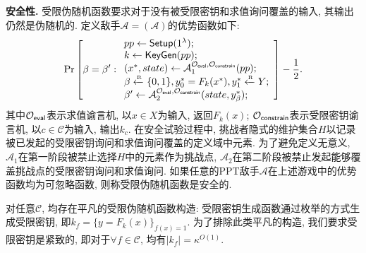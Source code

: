 \begin{trivlist}
\item \textbf{安全性.} 受限伪随机函数要求对于没有被受限密钥和求值询问覆盖的输入, 其输出仍然是伪随机的. 
    定义敌手$\mathcal{A} = (\mathcal{A})$的优势函数如下: 
\begin{displaymath}
    \Pr \left[\beta = \beta': 
    \begin{array}{l}
        pp \leftarrow \mathsf{Setup}(1^\lambda); \\
        k \leftarrow \mathsf{KeyGen}(pp); \\
        (x^*, state) \leftarrow \mathcal{A}_1^{\mathcal{O}_\mathsf{eval}, \mathcal{O}_\mathsf{constrain}}(pp);\\
        \beta \xleftarrow{\textup{\tiny R}} \{0, 1\}, y_0^* = F_k(x^*), y_1^* \xleftarrow{\textup{\tiny R}} Y; \\
        \beta' \leftarrow \mathcal{A}_2^{\mathcal{O}_\mathsf{eval}, \mathcal{O}_\mathsf{constrain}}(state, y_\beta^*);
    \end{array}
    \right] - \frac{1}{2}.
\end{displaymath}
其中$\mathcal{O}_\mathsf{eval}$表示求值谕言机, 以$x \in X$为输入, 返回$F_k(x)$; 
$\mathcal{O}_\mathsf{constrain}$表示受限密钥谕言机, 以$c \in \mathcal{C}$为输入, 输出$k_c$. 
在安全试验过程中, 挑战者隐式的维护集合$H$以记录被已发起的受限密钥询问和求值询问覆盖的定义域中元素.  
为了避免定义无意义, $\mathcal{A}_1$在第一阶段被禁止选择$H$中的元素作为挑战点, 
$\mathcal{A}_2$在第二阶段被禁止发起能够覆盖挑战点的受限密钥询问和求值询问. 
如果任意的PPT敌手$\mathcal{A}$在上述游戏中的优势函数均为可忽略函数, 则称受限伪随机函数是安全的. 
\end{trivlist}

\begin{remark}
对任意$\mathcal{C}$, 均存在平凡的受限伪随机函数构造: 受限密钥生成函数通过枚举的方式生成受限密钥, 即$k_f = \{y = F_k(x)\}_{f(x)=1}$. 
为了排除此类平凡的构造, 我们要求受限密钥是紧致的, 即对于$\forall f \in \mathcal{C}$, 均有$|k_f| = \kappa^{O(1)}$. 
\end{remark}

